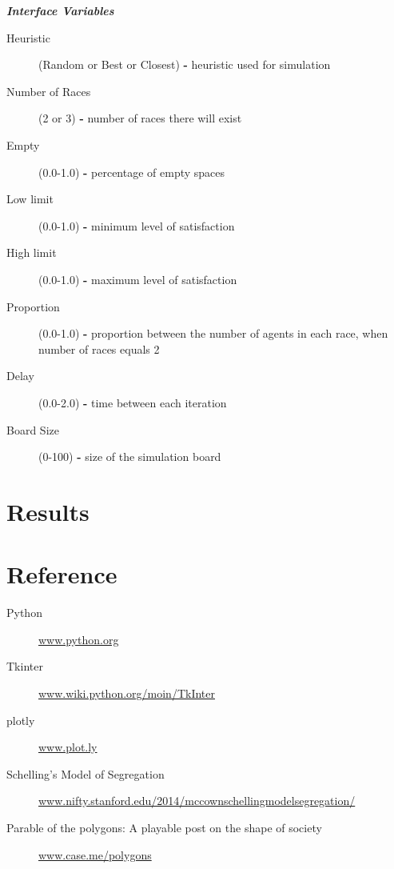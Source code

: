 \documentclass[a4paper,titlepage,11pt]{article}
\begin{document}
\textit{ \textbf{Interface Variables} }

\begin{description}
\item [ Heuristic ] (Random or Best or Closest) \textbf{-} heuristic used for simulation
\item [ Number of Races ] (2 or 3) \textbf{-} number of races there will exist
\item [ Empty ] (0.0-1.0) \textbf{-} percentage of empty spaces
\item [ Low limit ] (0.0-1.0) \textbf{-} minimum level of satisfaction
\item [ High limit ] (0.0-1.0) \textbf{-} maximum level of satisfaction
\item [ Proportion ] (0.0-1.0) \textbf{-} proportion between the number of agents in each race, when number of races equals 2
\item [ Delay ] (0.0-2.0) \textbf{-} time between each iteration
\item [ Board Size ] (0-100) \textbf{-} size of the simulation board
\end{description}

\newpage 

\section{Results}

\newpage

\section{Reference}

\begin{description}
  \item[Python] \href{https://www.python.org}{www.python.org}
  \item[Tkinter] \href{https://wiki.python.org/moin/TkInter}{www.wiki.python.org/moin/TkInter}
  \item[plotly] \href{https://plot.ly/}{www.plot.ly}
  \item[Schelling's Model of Segregation] \href{http://nifty.stanford.edu/2014/mccown-schelling-model-segregation/}{www.nifty.stanford.edu/2014/mccownschellingmodelsegregation/}
  \item[Parable of the polygons: A playable post on the shape of society] \href{http://ncase.me/polygons/}{www.case.me/polygons}
\end{description}

\newpage
\end{document}
